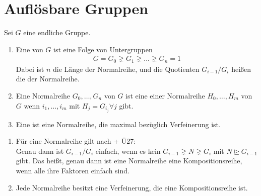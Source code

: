 \section{Auflösbare Gruppen}

Sei $G$ eine endliche Gruppe.

\begin{definition}
	\begin{enumerate}
		\item Eine  von $G$ ist eine Folge von Untergruppen
		\begin{align}
		G = G_0 \gneq G_1 \gneq ... \gneq G_n = 1
		\end{align}
		Dabei ist $n$ die Länge der Normalreihe, und die Quotienten $G_{i-1}/G_i$ heißen die  der Normalreihe.
		\item Eine Normalreihe $G_0, \dots, G_n$ von $G$ ist eine  einer Normalreihe $H_0,\dots,H_m$  von $G$ wenn $i_1,\dots,i_m$ mit $H_j = G_{i_{j}} \forall j$ gibt.
		\item Eine  ist eine Normalreihe, die maximal bezüglich Verfeinerung ist.
	\end{enumerate}
\end{definition}

\begin{remark}
	\begin{enumerate}
		\item Für eine Normalreihe  gilt nach  + Ü27:\\ %
		Genau dann ist $G_{i-1}/G_i$ einfach, wenn es kein $G_{i-1} \gneq N \gneq G_i$ mit $N \unrhd G_{i-1}$ gibt. Das heißt, genau dann ist eine Normalreihe eine Kompositionsreihe, wenn alle ihre Faktoren einfach sind. %
		\item Jede Normalreihe besitzt eine Verfeinerung, die eine Kompositionsreihe ist.
	\end{enumerate}
\end{remark}

